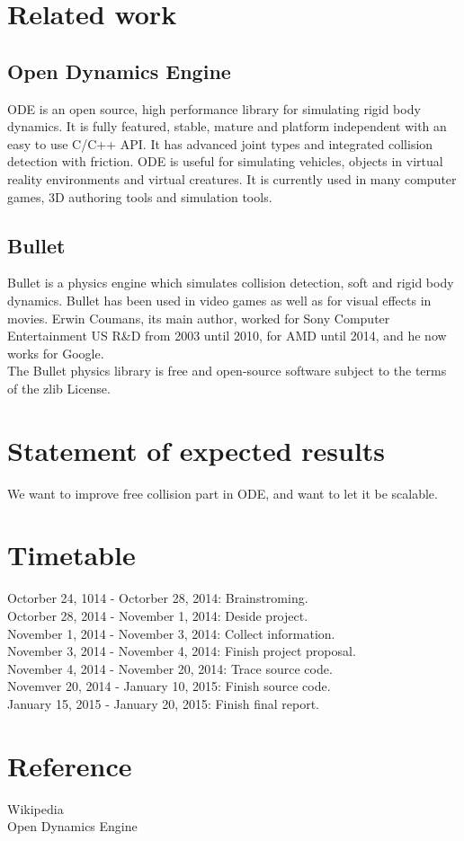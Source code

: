 \documentclass{acm_proc_article-sp}
\begin{document}
\section{Related work}
\subsection{Open Dynamics Engine}
ODE is an open source, high performance library for simulating rigid body dynamics. It is fully featured, stable, mature and platform independent with an easy to use C/C++ API. It has advanced joint types and integrated collision detection with friction. ODE is useful for simulating vehicles, objects in virtual reality environments and virtual creatures. It is currently used in many computer games, 3D authoring tools and simulation tools. 
\subsection{Bullet}
Bullet is a physics engine which simulates collision detection, soft and rigid body dynamics. Bullet has been used in video games as well as for visual effects in movies. Erwin Coumans, its main author, worked for Sony Computer Entertainment US R&D from 2003 until 2010, for AMD until 2014, and he now works for Google.\\
The Bullet physics library is free and open-source software subject to the terms of the zlib License.

\section{Statement of expected results}
We want to improve free collision part in ODE, and want to let it be scalable.

\section{Timetable}
Octorber 24, 1014 - Octorber 28, 2014: Brainstroming.\\
Octorber 28, 2014 - November 1, 2014: Deside project.\\
November 1, 2014 - November 3, 2014: Collect information.\\
November 3, 2014 - November 4, 2014: Finish project proposal.\\
November 4, 2014 - November 20, 2014: Trace source code.\\
Novemver 20, 2014 - January 10, 2015: Finish source code.\\
January 15, 2015 - January 20, 2015: Finish final report.\\

\section{Reference}
Wikipedia\\
Open Dynamics Engine
\end{document}

